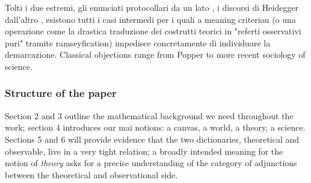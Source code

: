 Tolti i due estremi, gli enunciati protocollari da un lato \cite{?}, i discorsi di Heidegger dall'altro \cite{?}, esistono tutti i casi intermedi per i quali a meaning criterion (o una operazione come la drastica traduzione dei costrutti teorici in "referti osservativi puri" tramite ramseyfication) impedisce concretamente di individuare la demarcazione. Classical objections range from Popper \cite{?} to more recent sociology of science.
\subsubsection*{Structure of the paper}
Section 2 and 3 outline the mathematical background we need throughout the work; section 4 introduces our mai notions: a canvas, a world, a theory, a science. Sections 5 and 6 will provide evidence that the two dictionaries, theoretical and observable, live in a very tight relation; a broadly intended meaning for the notion of \emph{theory} asks for a precise understanding of the category of adjunctions between the theoretical and observational side.